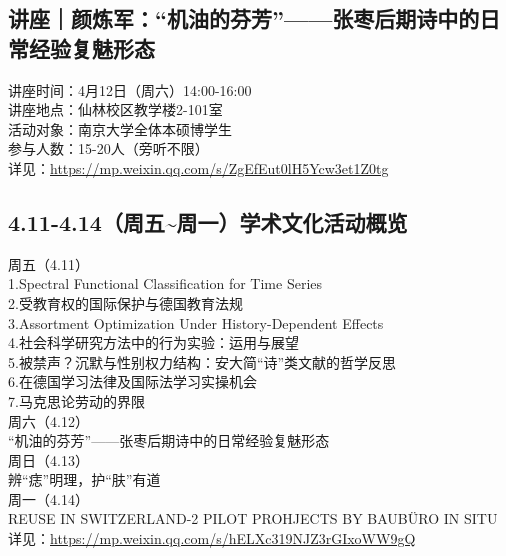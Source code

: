 \documentclass[letterpaper, 12pt]{article}
\begin{document}
\begin{multicols}{2}
\subsection{讲座｜颜炼军：“机油的芬芳”——张枣后期诗中的日常经验复魅形态}
讲座时间：4月12日（周六）14:00-16:00
\\讲座地点：仙林校区教学楼2-101室
\\活动对象：南京大学全体本硕博学生
\\参与人数：15-20人（旁听不限）
\\详见：\url{https://mp.weixin.qq.com/s/ZgEfEut0lH5Ycw3et1Z0tg}

\subsection{4.11-4.14（周五\textasciitilde{}周一）学术文化活动概览}
周五（4.11）
\\1.Spectral Functional Classification for Time Series
\\2.受教育权的国际保护与德国教育法规
\\3.Assortment Optimization Under History-Dependent Effects
\\4.社会科学研究方法中的行为实验：运用与展望
\\5.被禁声？沉默与性别权力结构：安大简“诗”类文献的哲学反思
\\6.在德国学习法律及国际法学习实操机会
\\7.马克思论劳动的界限
\\周六（4.12）
\\“机油的芬芳”——张枣后期诗中的日常经验复魅形态
\\周日（4.13）
\\辨“痣”明理，护“肤”有道
\\周一（4.14）
\\REUSE IN SWITZERLAND-2 PILOT PROHJECTS BY BAUBÜRO IN SITU
\\详见：\url{https://mp.weixin.qq.com/s/hELXc319NJZ3rGIxoWW9gQ}



\end{multicols}
\end{document}
